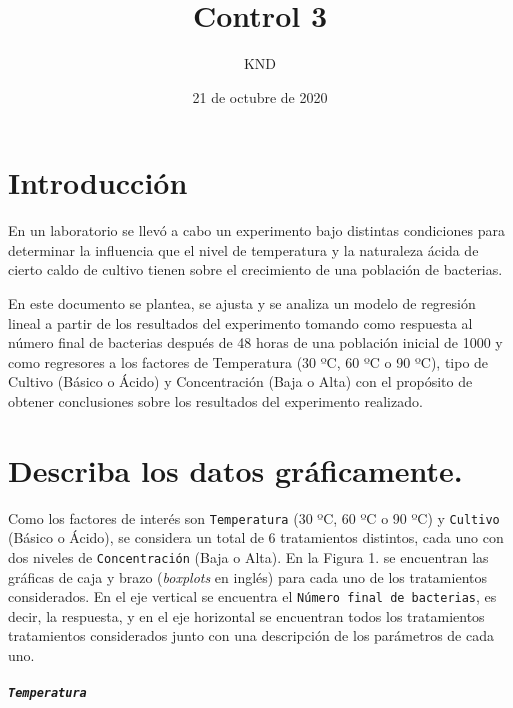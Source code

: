 \documentclass[10pt, spanish]{article}
\title{Control 3}
\date{21 de octubre de 2020}
\author{KND}
\begin{document}
    
    \maketitle
    
    

    
    \hypertarget{introducciuxf3n}{%
\section{Introducción}\label{introducciuxf3n}}

    En un laboratorio se llevó a cabo un experimento bajo distintas
condiciones para determinar la influencia que el nivel de temperatura y
la naturaleza ácida de cierto caldo de cultivo tienen sobre el
crecimiento de una población de bacterias.

En este documento se plantea, se ajusta y se analiza un modelo de
regresión lineal a partir de los resultados del experimento tomando como
respuesta al número final de bacterias después de 48 horas de una
población inicial de 1000 y como regresores a los factores de
Temperatura (30 ºC, 60 ºC o 90 ºC), tipo de Cultivo (Básico o Ácido) y
Concentración (Baja o Alta) con el propósito de obtener conclusiones
sobre los resultados del experimento realizado.

    \hypertarget{describa-los-datos-gruxe1ficamente.}{%
\section{Describa los datos
gráficamente.}\label{describa-los-datos-gruxe1ficamente.}}

    Como los factores de interés son \texttt{Temperatura} (30 ºC, 60 ºC o 90
ºC) y \texttt{Cultivo} (Básico o Ácido), se considera un total de 6
tratamientos distintos, cada uno con dos niveles de
\texttt{Concentración} (Baja o Alta). En la Figura 1. se encuentran las
gráficas de caja y brazo (\emph{boxplots} en inglés) para cada uno de
los tratamientos considerados. En el eje vertical se encuentra el
\texttt{Número\ final\ de\ bacterias}, es decir, la respuesta, y en el
eje horizontal se encuentran todos los tratamientos tratamientos
considerados junto con una descripción de los parámetros de cada uno.

    \begin{center}
    \end{center}
    
    
    \hypertarget{temperatura}{%
\subparagraph{\texorpdfstring{\texttt{Temperatura}}{Temperatura}}\label{temperatura}}
\end{document}
